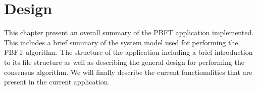 \chapter{Design}
\label{chapter:Design}

This chapter present an overall summary of the PBFT application implemented. This includes a brief summary of the system model used for performing the PBFT algorithm. The structure of the application including a brief introduction to its file structure as well as describing the general design for performing the consensus algorithm. We will finally describe the current functionalities that are present in the current application. 

